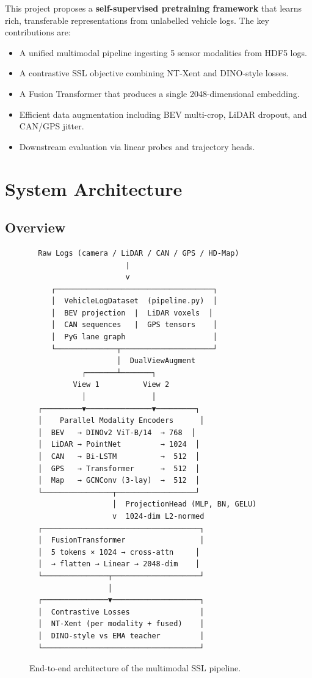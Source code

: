 \documentclass[12pt,a4paper]{article}
\begin{document}
This project proposes a \textbf{self-supervised pretraining framework} that learns
rich, transferable representations from unlabelled vehicle logs. The key contributions are:

\begin{itemize}[leftmargin=1.5em]
    \item A unified multimodal pipeline ingesting 5 sensor modalities from HDF5 logs.
    \item A contrastive SSL objective combining NT-Xent and DINO-style losses.
    \item A Fusion Transformer that produces a single 2048-dimensional embedding.
    \item Efficient data augmentation including BEV multi-crop, LiDAR dropout, and CAN/GPS jitter.
    \item Downstream evaluation via linear probes and trajectory heads.
\end{itemize}

\section{System Architecture}

\subsection{Overview}

\begin{figure}[H]
\centering
\begin{tcolorbox}[colback=codeGray, colframe=codeBorder, width=\textwidth]
\begin{verbatim}
  Raw Logs (camera / LiDAR / CAN / GPS / HD-Map)
                      |
                      v
     ┌────────────────────────────────────┐
     │  VehicleLogDataset  (pipeline.py)  │
     │  BEV projection  |  LiDAR voxels  │
     │  CAN sequences   |  GPS tensors    │
     │  PyG lane graph                    │
     └──────────────┬─────────────────────┘
                    │  DualViewAugment
            ┌───────┴───────┐
          View 1          View 2
            │               │
  ┌─────────▼───────────────▼─────────┐
  │    Parallel Modality Encoders      │
  │  BEV   → DINOv2 ViT-B/14  → 768  │
  │  LiDAR → PointNet         → 1024  │
  │  CAN   → Bi-LSTM          →  512  │
  │  GPS   → Transformer      →  512  │
  │  Map   → GCNConv (3-lay)  →  512  │
  └────────────────┬──────────────────┘
                   │  ProjectionHead (MLP, BN, GELU)
                   v  1024-dim L2-normed
  ┌────────────────────────────────────┐
  │  FusionTransformer                 │
  │  5 tokens × 1024 → cross-attn     │
  │  → flatten → Linear → 2048-dim    │
  └───────────────┬────────────────────┘
                  │
  ┌───────────────▼────────────────────┐
  │  Contrastive Losses                │
  │  NT-Xent (per modality + fused)    │
  │  DINO-style vs EMA teacher         │
  └────────────────────────────────────┘
\end{verbatim}
\end{tcolorbox}
\caption{End-to-end architecture of the multimodal SSL pipeline.}
\end{figure}
\end{document}
